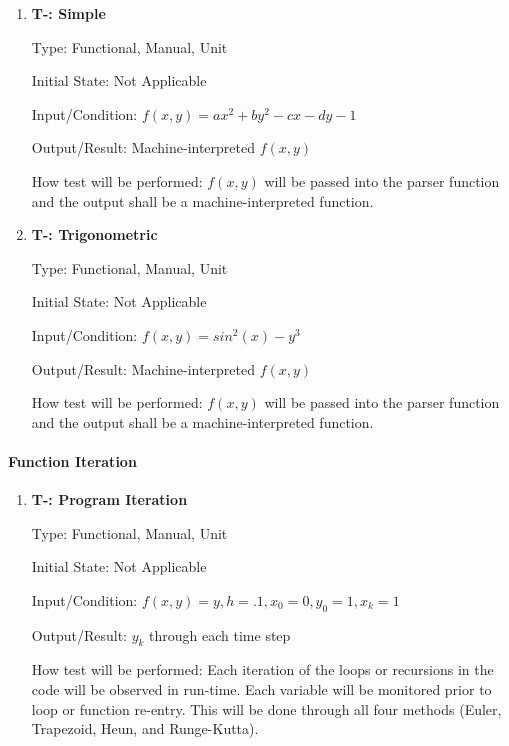 \documentclass[12pt, titlepage]{article}
\newcounter{tnum} %
\begin{document}
\begin{enumerate}

\item{\textbf{T-\thetnum \label{t-parser1}: Simple}}

Type: Functional, Manual, Unit 
					
Initial State: Not Applicable
					
Input/Condition: $f(x, y) = ax^2 + by^2 - cx - dy - 1$
					
Output/Result: Machine-interpreted $f(x, y)$
					
How test will be performed: $f(x, y)$ will be passed into the parser function and the output shall be a
machine-interpreted function.

\item{\textbf{T-\thetnum \label{t-parser1}: Trigonometric}}

Type: Functional, Manual, Unit 
					
Initial State: Not Applicable
					
Input/Condition: $f(x, y) = sin^2(x) - y^3$
					
Output/Result: Machine-interpreted $f(x, y)$
					
How test will be performed: $f(x, y)$ will be passed into the parser function and the output shall be a
machine-interpreted function.

\end{enumerate}
		
\paragraph{Function Iteration}

\begin{enumerate}

\item{\textbf{T-\thetnum \label{t-difference}: Program Iteration}}

Type: Functional, Manual, Unit 
					
Initial State: Not Applicable
					
Input/Condition: $f(x, y) = y, h = .1, x_0 = 0, y_0 = 1, x_k = 1$
					
Output/Result: $y_k$ through each time step

How test will be performed: Each iteration of the loops or recursions in the code will be observed in run-time.
Each variable will be monitored prior to loop or function re-entry. This will be done through all four methods (Euler, 
Trapezoid, Heun, and Runge-Kutta).

\end{enumerate}
\end{document}
